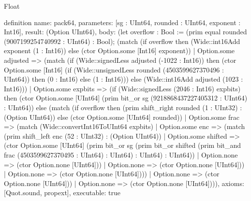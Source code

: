\begin{lexlean}{Float}
\begin{semanticmodule}
definition{
  name: pack64,
  parameters: [sg : UInt64, rounded : UInt64, exponent : Int16],
  result: (Option UInt64),
  body: (let overflow : Bool := (prim equal rounded (9007199254740992 : UInt64) : Bool); (match (if overflow then (Wide::int16Add exponent (1 : Int16)) else (ctor Option.some [Int16] exponent))
    | Option.some adjusted => (match (if (Wide::signedLess adjusted (-1022 : Int16)) then (ctor Option.some [Int16] (if (Wide::unsignedLess rounded (4503599627370496 : UInt64)) then (0 : Int16) else (1 : Int16))) else (Wide::int16Add adjusted (1023 : Int16)))
      | Option.some expbits => (if (Wide::signedLess (2046 : Int16) expbits) then (ctor Option.some [UInt64] (prim bit_or sg (9218868437227405312 : UInt64) : UInt64)) else (match (if overflow then (prim shift_right rounded (1 : UInt32) : (Option UInt64)) else (ctor Option.some [UInt64] rounded))
        | Option.some frac => (match (Wide::convertInt16ToUInt64 expbits)
          | Option.some enc => (match (prim shift_left enc (52 : UInt32) : (Option UInt64))
            | Option.some shifted => (ctor Option.some [UInt64] (prim bit_or sg (prim bit_or shifted (prim bit_and frac (4503599627370495 : UInt64) : UInt64) : UInt64) : UInt64))
            | Option.none => (ctor Option.none [UInt64]))
          | Option.none => (ctor Option.none [UInt64]))
        | Option.none => (ctor Option.none [UInt64])))
      | Option.none => (ctor Option.none [UInt64]))
    | Option.none => (ctor Option.none [UInt64]))),
  axioms: [Quot.sound, propext],
  executable: true
}


\end{semanticmodule}
\end{lexlean}
